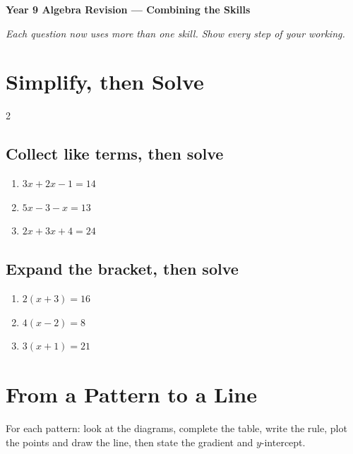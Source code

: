 \documentclass[11pt]{article}
\newcommand{\ans}{\hrulefill}
\begin{document}
\begin{center}
  {\Large\bfseries Year 9 Algebra Revision --- Combining the Skills}
\end{center}
\vspace{0.3em}
\noindent\textit{Each question now uses more than one skill. Show every step of your working.}

\vspace{0.4em}
\section{Simplify, then Solve}

\begin{multicols}{2}
\subsection*{Collect like terms, then solve}
\begin{enumerate}
  \item $3x + 2x - 1 = 14$ \ans
  \item $5x - 3 - x = 13$ \ans
  \item $2x + 3x + 4 = 24$ \ans
\end{enumerate}

\subsection*{Expand the bracket, then solve}
\begin{enumerate}[resume]
  \item $2(x + 3) = 16$ \ans
  \item $4(x - 2) = 8$ \ans
  \item $3(x + 1) = 21$ \ans
\end{enumerate}
\end{multicols}

\section{From a Pattern to a Line}
\noindent For each pattern: look at the diagrams, complete the table, write the rule, plot the points and draw the line, then state the gradient and $y$-intercept.
\end{document}
